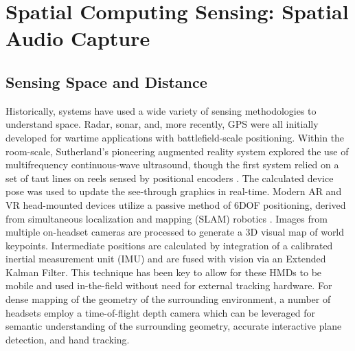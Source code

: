 \documentclass [11pt, proquest] {uwthesis}[2020/02/24]
\begin{document}














\section{Spatial Computing Sensing: Spatial Audio Capture} 

\subsection{Sensing Space and Distance}

Historically, systems have used a wide variety of sensing methodologies to understand space. Radar, sonar, and, more recently, GPS were all initially developed for wartime applications with battlefield-scale positioning. Within the room-scale, Sutherland's pioneering augmented reality system explored the use of multifrequency continuous-wave ultrasound, though the first system relied on a set of taut lines on reels sensed by positional encoders \cite{10.1145/280811.281016}. The calculated device pose was used to update the see-through graphics in real-time. Modern AR and VR head-mounted devices utilize a passive method of 6DOF positioning, derived from simultaneous localization and mapping (SLAM) robotics \cite{KleinPTAM}. Images from multiple on-headset cameras are processed to generate a 3D visual map of world keypoints. Intermediate positions are calculated by integration of a calibrated inertial measurement unit (IMU) and are fused with vision via an Extended Kalman Filter. This technique has been key to allow for these HMDs to be mobile and used in-the-field without need for external tracking hardware. For dense mapping of the geometry of the surrounding environment, a number of headsets \cite{microsoft, magicleap, varjo} employ a time-of-flight depth camera which can be leveraged for semantic understanding of the surrounding geometry, accurate interactive plane detection, and hand tracking. %
\end{document}
